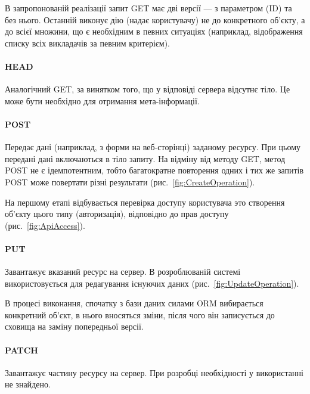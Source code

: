 В запропонованій реалізації запит GET має дві версії — з параметром (ID) та без нього. Останній виконує дію (надає користувачу) не до конкретного об’єкту, а до всієї множини, що є необхідним в певних ситуаціях (наприклад, відображення списку всіх викладачів за певним критерієм).

\paragraph{HEAD}

Аналогічний GET, за винятком того, що у відповіді сервера відсутнє тіло. Це може бути необхідно для отримання мета-інформації.

\paragraph{POST}

Передає дані (наприклад, з форми на веб-сторінці) заданому ресурсу. При цьому передані дані включаються в тіло запиту. На відміну від методу GET, метод POST не є ідемпотентним, тобто багатократне повторення одних і тих же запитів POST може повертати різні результати (рис.~\ref{fig:CreateOperation}).

На першому етапі відбувається перевірка доступу користувача это створення об’єкту цього типу (авторизація), відповідно до прав доступу (рис.~\ref{fig:ApiAccess}).

\paragraph{PUT}

Завантажує вказаний ресурс на сервер. В розроблюваній системі використовується для редагування існуючих даних (рис.~\ref{fig:UpdateOperation}). 

В процесі виконання, спочатку з бази даних силами ORM вибирається конкретний об’єкт, в нього вносяться зміни, після чого він записується до сховища на заміну попередньої версії.

\paragraph{PATCH}

Завантажує частину ресурсу на сервер. При розробці необхідності у використанні не знайдено.

